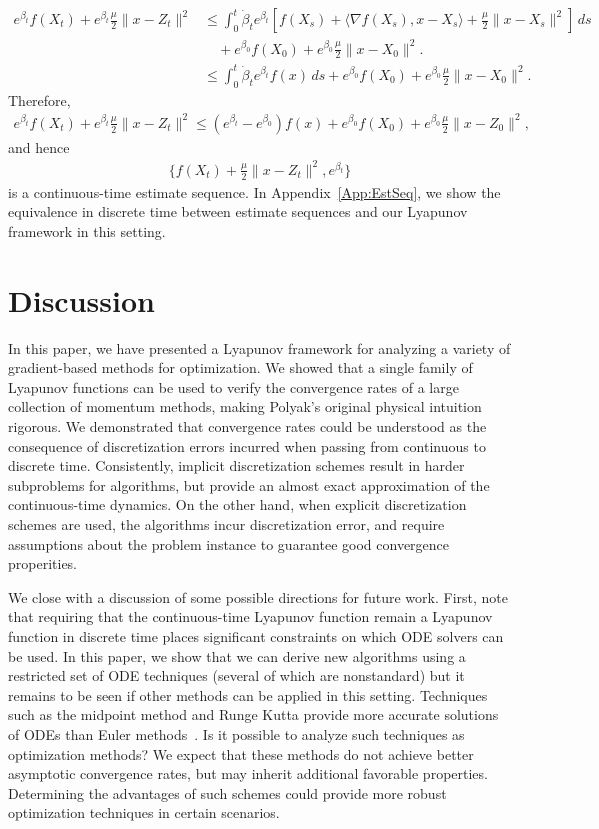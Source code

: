 \documentclass[11pt]{article}
\theoremstyle{plain}
\begin{document}
\begin{align*}
e^{\beta_t} f(X_t) + e^{\beta_t}\frac{\mu}{2} \|x - Z_t\|^2 &\leq \int_0^t\dot \beta_t e^{\beta_t}[ f(X_s)+ \langle \nabla f(X_s), x - X_s \rangle+ \frac{\mu}{2} \|x - X_s\|^2]\, ds\\
& \quad+ e^{\beta_0}f(X_0) + e^{\beta_0}\frac{\mu}{2} \|x - X_0\|^2.\\
&\leq \int_0^t\dot \beta_t e^{\beta_t}f(x) \,ds+ e^{\beta_0}f(X_0) + e^{\beta_0}\frac{\mu}{2} \|x - X_0\|^2.
\end{align*}
Therefore, 
\begin{align*}
e^{\beta_t} f(X_t) + e^{\beta_t}\frac{\mu}{2} \|x - Z_t\|^2 \leq (e^{\beta_t} - e^{\beta_0}) f(x) + e^{\beta_0}  f(X_0) + e^{\beta_0} \frac{\mu}{2} \|x - Z_0\|^2,
\end{align*}
and hence \begin{align*}
\{f(X_t) + \frac{\mu}{2} \|x - Z_t\|^2, e^{\beta_t}\}
\end{align*}
is a continuous-time estimate sequence. In Appendix~\ref{App:EstSeq}, we show the equivalence in discrete time between estimate sequences and our Lyapunov framework in this setting.

\section{Discussion}
In this paper, we have presented a Lyapunov framework for analyzing a variety of gradient-based methods for optimization. We showed that a single family of Lyapunov functions can be used to verify the convergence rates of a large collection of momentum methods, making Polyak's original physical intuition rigorous.  We demonstrated that convergence rates could be understood as the consequence of discretization errors incurred when passing from continuous to discrete time.  Consistently, implicit discretization schemes result in harder subproblems for algorithms, but provide an almost exact approximation of the continuous-time dynamics.   On the other hand, when explicit discretization schemes are used, the algorithms incur discretization error, and require assumptions about the problem instance to guarantee good convergence properities.

We close with a discussion of some possible directions for future work.  First, note that requiring that the continuous-time Lyapunov function remain a Lyapunov function in discrete time places significant constraints on which ODE solvers can be used.  In this paper, we show that we can derive new algorithms using a restricted set of ODE techniques (several of which are nonstandard) but it remains to be seen if other methods can be applied in this setting.  Techniques such as the midpoint method and Runge Kutta provide more accurate solutions of ODEs than Euler methods~\cite{Butcher20001}.  Is it possible to analyze such techniques as optimization methods?  We expect that these methods do not achieve better asymptotic convergence rates, but may inherit additional favorable properties.  Determining the advantages of such schemes could provide more robust optimization techniques in certain scenarios.
\end{document}
